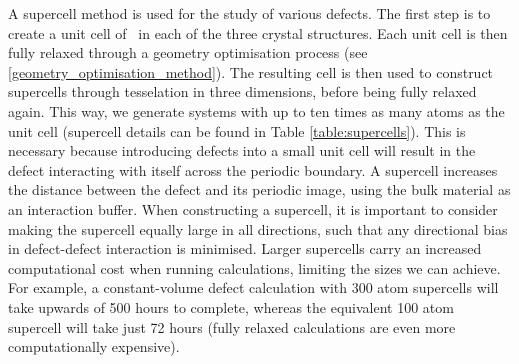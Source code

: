 A supercell method is used for the study of various defects. The first step is to create a unit cell of \zirconia\ in each of the three crystal structures. Each unit cell is then fully relaxed through a geometry optimisation process (see \ref{geometry_optimisation_method}). The resulting cell is then used to construct supercells through tesselation in three dimensions, before being fully relaxed again. This way, we generate systems with up to ten times as many atoms as the unit cell (supercell details can be found in Table \ref{table:supercells}). This is necessary because introducing defects into a small unit cell will result in the defect interacting with itself across the periodic boundary. A supercell increases the distance between the defect and its periodic image, using the bulk material as an interaction buffer. When constructing a supercell, it is important to consider making the supercell equally large in all directions, such that any directional bias in defect-defect interaction is minimised. Larger supercells carry an increased computational cost when running calculations, limiting the sizes we can achieve. For example, a constant-volume defect calculation with 300 atom supercells will take upwards of 500 hours to complete, whereas the equivalent 100 atom supercell will take just 72 hours (fully relaxed calculations are even more computationally expensive).


